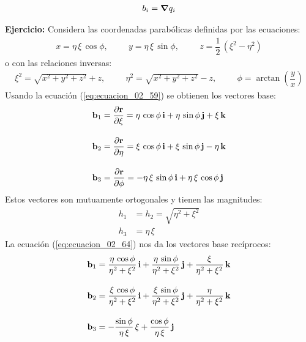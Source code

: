 \documentclass[12pt]{article}
\begin{document}
\begin{align}
    b_{i} = \grad{q_{i}}
    \label{eq:ecuacion_02_68}
\end{align}
\par
\noindent
\textbf{Ejercicio: } Considera las coordenadas parabólicas definidas por las ecuaciones:
\begin{align*}
    x = \eta \, \xi \, \cos \phi, \hspace{1cm} y = \eta \, \xi \, \sin \phi, \hspace{1cm} z = \dfrac{1}{2} \, \left( \xi^{2} - \eta^{2} \right)
\end{align*}
o con las relaciones inversas:
\begin{align*}
    \xi^{2} = \sqrt{x^{2} + y^{2} + z^{2}} + z, \hspace{1cm} \eta^{2} = \sqrt{x^{2} + y^{2} + z^{2}} - z, \hspace{1cm} \phi = \arctan \left( \dfrac{y}{x} \right) 
\end{align*}
Usando la ecuación (\ref{eq:ecuacion_02_59}) se obtienen los vectores base:
\begin{align*}
    \vb{b}_{1} &= \pdv{\vb{r}}{\xi} = \eta \, \cos \phi \, \vb{i} + \eta \, \sin \phi \, \vb{j} + \xi \, \vb{k} \\[1em]
    \vb{b}_{2} &= \pdv{\vb{r}}{\eta} = \xi \, \cos \phi \, \vb{i} + \xi \, \sin \phi \, \vb{j} - \eta \, \vb{k} \\[1em]
    \vb{b}_{3} &= \pdv{\vb{r}}{\phi} = - \eta \, \xi \, \sin \phi \, \vb{i} + \eta \, \xi \, \cos \phi \, \vb{j}
\end{align*}
Estos vectores son mutuamente ortogonales y tienen las magnitudes:
\begin{align*}
    h_{1} &= h_{2} = \sqrt{\eta^{2} + \xi^{2}} \\[0.5em]
    h_{3} &= \eta \, \xi
\end{align*} 
La ecuación (\ref{eq:ecuacion_02_64}) nos da los vectores base recíprocos:
\begin{align*}
    \vb{b}_{1} &= \dfrac{ \eta \, \cos \phi}{\eta^{2} + \xi^{2}} \, \vb{i} + \dfrac{\eta \, \sin \phi}{\eta^{2} + \xi^{2}} \, \vb{j} + \dfrac{\xi}{\eta^{2} + \xi^{2}} \, \vb{k} \\[1em]
    \vb{b}_{2} &= \dfrac{ \xi \, \cos \phi}{\eta^{2} + \xi^{2}} \, \vb{i} + \dfrac{\xi \, \sin \phi}{\eta^{2} + \xi^{2}} \, \vb{j} + \dfrac{\eta}{\eta^{2} + \xi^{2}} \, \vb{k} \\[1em]
    \vb{b}_{3} &= - \dfrac{\sin \phi}{\eta \, \xi} \, \xi + \dfrac{\cos \phi}{\eta \, \xi} \, \vb{j}
\end{align*}
\end{document}
